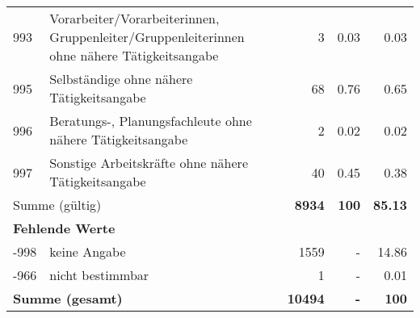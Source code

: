 \begin{longtable}{lXrrr}
        993 & \multicolumn{1}{X}{Vorarbeiter/Vorarbeiterinnen, Gruppenleiter/Gruppenleiterinnen ohne nähere Tätigkeitsangabe} & %
          \num{3} &
          \num[round-mode=places,round-precision=2]{0,03} &
          \num[round-mode=places,round-precision=2]{0,03} \\

        995 & \multicolumn{1}{X}{Selbständige ohne nähere Tätigkeitsangabe} & %
          \num{68} &
          \num[round-mode=places,round-precision=2]{0,76} &
          \num[round-mode=places,round-precision=2]{0,65} \\

        996 & \multicolumn{1}{X}{Beratungs-, Planungsfachleute ohne nähere Tätigkeitsangabe} & %
          \num{2} &
          \num[round-mode=places,round-precision=2]{0,02} &
          \num[round-mode=places,round-precision=2]{0,02} \\

        997 & \multicolumn{1}{X}{Sonstige Arbeitskräfte ohne nähere Tätigkeitsangabe} & %
          \num{40} &
          \num[round-mode=places,round-precision=2]{0,45} &
          \num[round-mode=places,round-precision=2]{0,38} \\

     \midrule
     \multicolumn{2}{l}{Summe (gültig)} &
       \textbf{\num{8934}} &
     \textbf{100} &
       \textbf{\num[round-mode=places,round-precision=2]{85,13}} \\
     \multicolumn{5}{l}{\textbf{Fehlende Werte}}\\
       -998 &
       keine Angabe &
         \num{1559} &
        - &
         \num[round-mode=places,round-precision=2]{14,86} \\
       -966 &
       nicht bestimmbar &
         \num{1} &
        - &
         \num[round-mode=places,round-precision=2]{0,01} \\
     \midrule
     \multicolumn{2}{l}{\textbf{Summe (gesamt)}} &
          \textbf{\num{10494}} &
        \textbf{-} &
        \textbf{100} \\
     \bottomrule
     \end{longtable}
     
